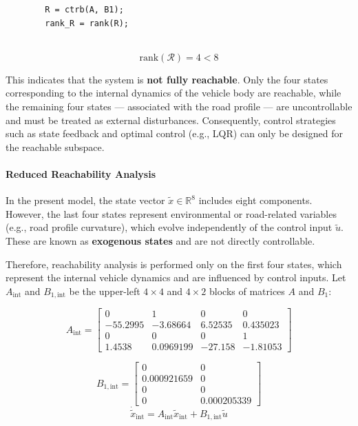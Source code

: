 \documentclass[]{report}
\begin{document}
	
	\begin{verbatim}
		R = ctrb(A, B1);
		rank_R = rank(R);
		
	\end{verbatim}
	
	
	\begin{equation}
		\text{rank}(\mathcal{R}) = 4 < 8
	\end{equation}
	
	
	This indicates that the system is \textbf{not fully reachable}. Only the four states corresponding to the internal dynamics of the vehicle body are reachable, while the remaining four states — associated with the road profile — are uncontrollable and must be treated as external disturbances. Consequently, control strategies such as state feedback and optimal control (e.g., LQR) can only be designed for the reachable subspace.
	
	\paragraph{Reduced Reachability Analysis}
	
	In the present model, the state vector $\tilde{x} \in \mathbb{R}^8$ includes eight components. However, the last four states represent environmental or road-related variables (e.g., road profile curvature), which evolve independently of the control input $\tilde{u}$. These are known as \textbf{exogenous states} and are not directly controllable.
	
	Therefore,  reachability analysis is performed only on the first four states, which represent the internal vehicle dynamics and are influenced by control inputs. Let $A_{\text{int}}$ and $B_{1, \text{int}}$ be the upper-left $4 \times 4$ and $4 \times 2$ blocks of matrices $A$ and $B_1$:
	
	
	\begin{equation}
		A_{\text{int}} =
	\begin{bmatrix}
		0 & 1 & 0 & 0 \\
		-55.2995 & -3.68664 & 6.52535 & 0.435023 \\
		0 & 0 & 0 & 1 \\
		1.4538 & 0.0969199 & -27.158 & -1.81053 
	\end{bmatrix}
	\end{equation}
	
	
\begin{equation}		
	B_{1,\text{int}} =
	\begin{bmatrix}
		0 & 0 \\
		0.000921659 & 0  \\
		0 & 0 \\
		0 & 0.000205339 
		
	\end{bmatrix}	
\end{equation}
\begin{equation}
	\dot{\tilde{x}}_{\text{int}} = A_{\text{int}} \tilde{x}_{\text{int}} + B_{1,\text{int}} \tilde{u}	
\end{equation}
	
\end{document}
